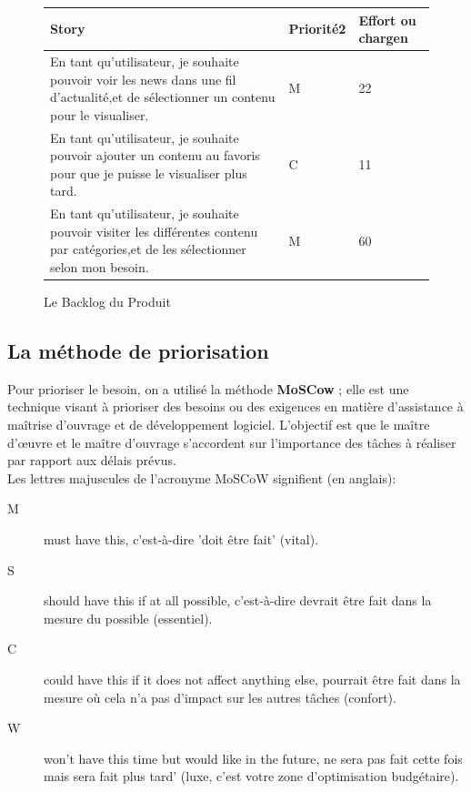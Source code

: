 \begin{figure}[h]
\begin{tabular}{|p{7cm}|p{4cm}|p{4cm}|}
\hline
\textbf{Story} & \textbf{Priorité2 } & \textbf{Effort ou chargen} \\
\hline
En tant qu'utilisateur, je souhaite pouvoir voir les news dans une fil d'actualité,et de sélectionner un contenu pour le visualiser. & \begin{center}M\end{center} & \begin{center}22\end{center}\\
\hline
En tant qu'utilisateur, je souhaite pouvoir ajouter un contenu au favoris pour que je puisse le visualiser plus tard. & \begin{center}C\end{center} & \begin{center}11\end{center}\\
\hline
En tant qu'utilisateur, je souhaite pouvoir visiter les différentes contenu par catégories,et de les sélectionner selon mon besoin. & \begin{center}M\end{center} & \begin{center}60\end{center}\\
\hline
\end{tabular}
  \caption{Le Backlog du Produit}
  \label{fig:Backlog}
\end{figure}
\subsection{La méthode de priorisation}
Pour prioriser le besoin, on a utilisé la méthode  \textbf{MoSCow} ; elle est une technique visant à prioriser des besoins ou des exigences en matière d'assistance à maîtrise d'ouvrage et de développement logiciel. L'objectif est que le maître d'œuvre et le maître d'ouvrage s'accordent sur l'importance des tâches à réaliser par rapport aux délais prévus.\\[0.2cm]
Les lettres majuscules de l'acronyme MoSCoW signifient (en anglais):\\[0.2cm]
\begin{description}
\item[M] must have this, c'est-à-dire 'doit être fait' (vital).
\item[S] should have this if at all possible, c'est-à-dire devrait être fait dans la mesure du possible (essentiel).
\item[C] could have this if it does not affect anything else, pourrait être fait dans la mesure où cela n'a pas d'impact sur les autres tâches (confort).
\item[W] won't have this time but would like in the future, ne sera pas fait cette fois mais sera fait plus tard' (luxe, c'est votre zone d'optimisation budgétaire).
\end{description}






